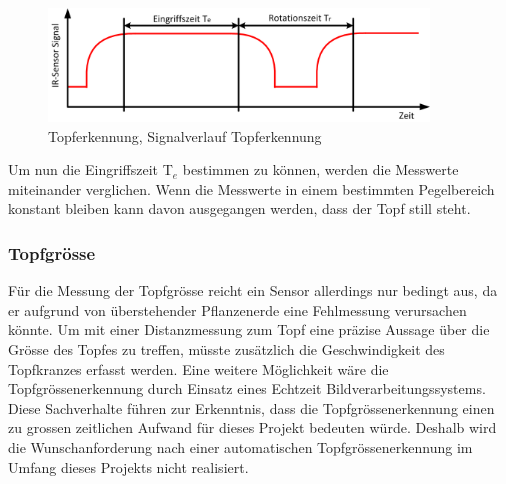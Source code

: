 \begin{figure}[H]
	\includegraphics[width=0.9\textwidth]{Illustrationen/6-Umsetzung/Topferkennung_Messsignal.png}
	\caption{Topferkennung, Signalverlauf Topferkennung}
	\label{fig:Signalbild_Topferkennung}
\end{figure}

Um nun die Eingriffszeit T$_{e}$ bestimmen zu können, werden die Messwerte miteinander verglichen. Wenn die Messwerte in einem bestimmten Pegelbereich konstant bleiben kann davon ausgegangen werden, dass der Topf still steht.

\subsubsection{Topfgrösse}
Für die Messung der Topfgrösse reicht ein Sensor allerdings nur bedingt aus, da er aufgrund von überstehender Pflanzenerde eine Fehlmessung verursachen könnte. Um mit einer Distanzmessung zum Topf eine präzise Aussage über die Grösse des Topfes zu treffen, müsste zusätzlich die Geschwindigkeit des Topfkranzes erfasst werden. Eine weitere Möglichkeit wäre die Topfgrössenerkennung  durch Einsatz eines Echtzeit Bildverarbeitungssystems. Diese Sachverhalte führen zur Erkenntnis, dass die Topfgrössenerkennung einen zu grossen zeitlichen Aufwand für dieses Projekt bedeuten würde. Deshalb wird die Wunschanforderung nach einer automatischen Topfgrössenerkennung im Umfang dieses Projekts nicht realisiert.
